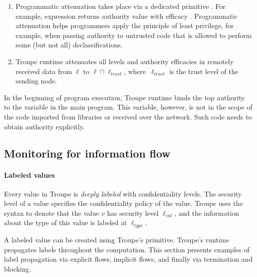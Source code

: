 \begin{enumerate}
\item
Programmatic attenuation takes place via a dedicated primitive . For example, expression  returns authority value with efficacy .  Programmatic attenuation helps programmers apply the principle of least privilege, for example, when passing authority to untrusted code that is allowed to perform some (but not all) declassifications.

\item Troupe runtime attenuates all levels and authority efficacies in remotely received data from $\ell$ to $\ell \sqcap \ell_{\mathit{trust}}$, where~$\ell_{\mathit{trust}}$ is the trust level of the sending node.
\end{enumerate}

In the beginning of program execution, Troupe runtime binds the top authority to the variable  in the main program. This variable, however, is not in the scope of the code imported from libraries or received over the network. Such code needs to obtain authority explicitly.

%
%
%


\subsection{Monitoring for information flow}


\paragraph{Labeled values}
Every value in Troupe is \emph{deeply labeled} with confidentiality
levels. The security level of
a value specifies the confidentiality policy of the
value. Troupe uses the syntax  to
denote that the value $\mathit{v}$ has security level
$\mathit{\ell_{\mathit{val}}}$, and the information about the type of this value is labeled at $\mathit{\ell_{\mathit{type}}}$.

A labeled value can be created using Troupe's 
primitive. Troupe's runtime propagates labels throughout the computation.
This section presents examples of label propagation via explicit flows, implicit flows, and
finally via termination and blocking.


